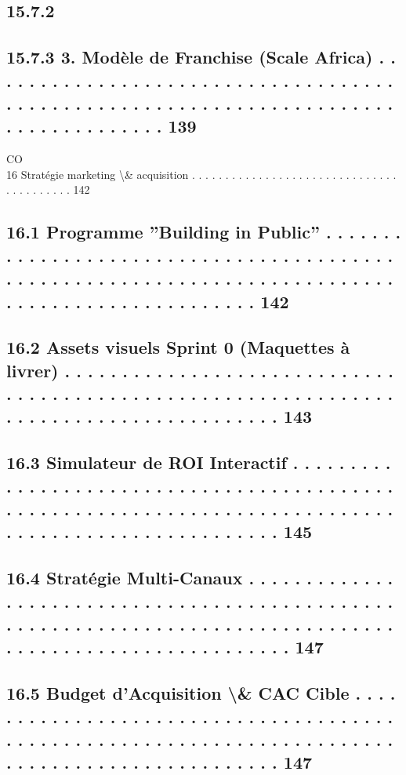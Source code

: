\documentclass[12pt,landscape,a4paper]{article}
\begin{document}
\subsection{15.7.2}
\subsection{15.7.3              3. Modèle de Franchise (Scale Africa) . . . . . . . . . . . . . . . . . . . . . . . . . . . . . . . . . . . . . . . . . . . . . . . . . . . . . . . . . . . . . . . . . . . . . . . . . . . . . . . . . . . . 139}
CO\\
16    Stratégie marketing \textbackslash{}& acquisition . . . . . . . . . . . . . . . . . . . . . . . . . . . . . . . . . . . . . . . . . 142\\
\subsection{16.1    Programme ”Building in Public” . . . . . . . . . . . . . . . . . . . . . . . . . . . . . . . . . . . . . . . . . . . . . . . . . . . . . . . . . . . . . . . . . . . . . . . . . . . . . . . . . . . . . . . . . . . . . . . . . 142}
\subsection{16.2    Assets visuels Sprint 0 (Maquettes à livrer) . . . . . . . . . . . . . . . . . . . . . . . . . . . . . . . . . . . . . . . . . . . . . . . . . . . . . . . . . . . . . . . . . . . . . . . . . . . . . . . . . . . . . . . 143}
\subsection{16.3    Simulateur de ROI Interactif . . . . . . . . . . . . . . . . . . . . . . . . . . . . . . . . . . . . . . . . . . . . . . . . . . . . . . . . . . . . . . . . . . . . . . . . . . . . . . . . . . . . . . . . . . . . . . . . . . . . . 145}
\subsection{16.4    Stratégie Multi-Canaux . . . . . . . . . . . . . . . . . . . . . . . . . . . . . . . . . . . . . . . . . . . . . . . . . . . . . . . . . . . . . . . . . . . . . . . . . . . . . . . . . . . . . . . . . . . . . . . . . . . . . . . . . . 147}
\subsection{16.5    Budget d’Acquisition \textbackslash{}& CAC Cible . . . . . . . . . . . . . . . . . . . . . . . . . . . . . . . . . . . . . . . . . . . . . . . . . . . . . . . . . . . . . . . . . . . . . . . . . . . . . . . . . . . . . . . . . . . . . . . . 147}
\end{document}
